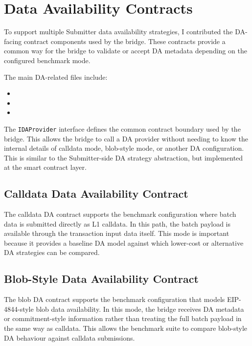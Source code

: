\section{Data Availability Contracts}

To support multiple Submitter data availability strategies, I contributed the DA-facing contract components used by the bridge. These contracts provide a common way for the bridge to validate or accept DA metadata depending on the configured benchmark mode.

The main DA-related files include:

\begin{itemize}
    \item {}
    \item {}
    \item {}
\end{itemize}

The \texttt{IDAProvider} interface defines the common contract boundary used by the bridge. This allows the bridge to call a DA provider without needing to know the internal details of calldata mode, blob-style mode, or another DA configuration. This is similar to the Submitter-side DA strategy abstraction, but implemented at the smart contract layer.

\subsection{Calldata Data Availability Contract}

The calldata DA contract supports the benchmark configuration where batch data is submitted directly as L1 calldata. In this path, the batch payload is available through the transaction input data itself. This mode is important because it provides a baseline DA model against which lower-cost or alternative DA strategies can be compared.

\subsection{Blob-Style Data Availability Contract}

The blob DA contract supports the benchmark configuration that models EIP-4844-style blob data availability. In this mode, the bridge receives DA metadata or commitment-style information rather than treating the full batch payload in the same way as calldata. This allows the benchmark suite to compare blob-style DA behaviour against calldata submissions.

